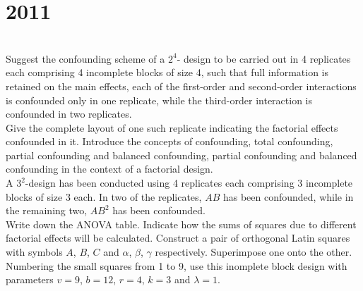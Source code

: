 \section*{2011}
\vspace{-.5cm}
\hrulefill \smallskip\\
 Suggest the confounding scheme of a $2^4$- design to be carried out in 4 replicates each comprising 4 incomplete blocks of size 4, such that full information is retained on the main effects, each of the first-order and second-order interactions is confounded only in one replicate, while the third-order interaction is confounded in two replicates. \smallskip \\ Give the complete layout of one such replicate indicating the factorial effects confounded in it.
\myline
{} Introduce the concepts of confounding, total confounding, partial confounding and balanced confounding, partial confounding and balanced confounding in the context of a factorial design. \smallskip \\
A $3^2$-design has been conducted using 4 replicates each comprising 3 incomplete blocks of size 3 each. In two of the replicates, $AB$ has been confounded, while in the remaining two, $AB^2$ has been confounded. \smallskip \\ 
Write down the ANOVA table. Indicate how the sums of squares due to different factorial effects will be calculated.
\myline
{} Construct a pair of orthogonal Latin squares with symbols $A$, $B$, $C$ and $\alpha$, $\beta$, $\gamma$ respectively. Superimpose one onto the other. Numbering the small squares from 1 to 9, use this inomplete block design with parameters $v=9$, $b=12$, $r=4$, $k=3$ and $\lambda = 1$.
